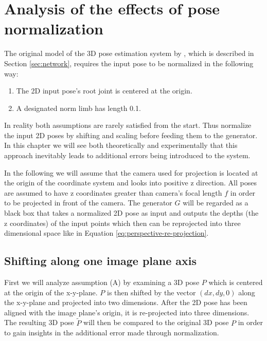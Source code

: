 \section{Analysis of the effects of pose normalization}

The original model of the 3D pose estimation system by \citet{drover18}, which is described in Section \ref{sec:network}, requires the input pose to be normalized in the following way:
\begin{enumerate}[label=(\Alph*)]
	\item The 2D input pose's root joint is centered at the origin.
	\item A designated norm limb has length 0.1.
\end{enumerate}

In reality both assumptions are rarely satisfied from the start.
Thus \citet{drover18} normalize the input 2D poses by shifting and scaling before feeding them to the generator.
In this chapter we will see both theoretically and experimentally that this approach inevitably leads to additional errors being introduced to the system.


In the following we will assume that the camera used for projection is located at the origin of the coordinate system and looks into positive z direction.
All poses are assumed to have z coordinates greater than camera's focal length $f$ in order to be projected in front of the camera.
The generator $G$ will be regarded as a black box that takes a normalized 2D pose as input and outputs the depths (the z coordinates) of the input points which then can be reprojected into three dimensional space like in Equation \eqref{eq:perspective-re-projection}.


\subsection{Shifting along one image plane axis}
\label{sec:x-shift-error}
First we will analyze assumption (A) by examining a 3D pose $P$ which is centered at the origin of the x-y-plane.
$P$ is then shifted by the vector $(dx, dy, 0)$ along the x-y-plane and projected into two dimensions.
After the 2D pose has been aligned with the image plane's origin, it is re-projected into three dimensions.
The resulting 3D pose $\widetilde{P}$ will then be compared to the original 3D pose $P$ in order to gain insights in the additional error made through normalization.

